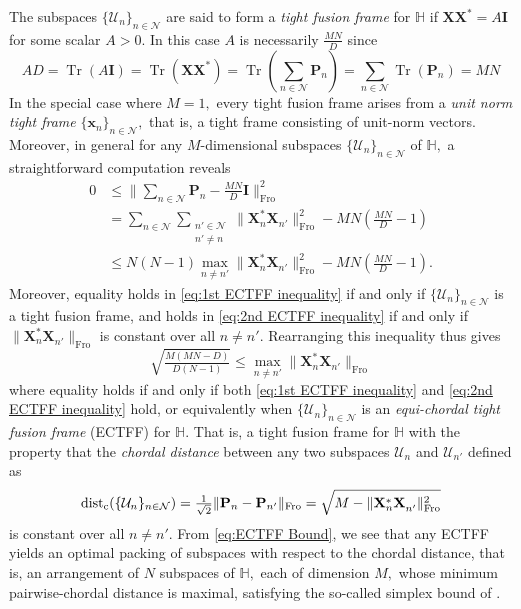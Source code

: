 \documentclass[3p,11pt]{elsarticle}
\newcommand{\bbH}{\mathbb{H}}
\newcommand{\bfI}{\mathbf{I}}
\newcommand{\bfP}{\mathbf{P}}
\newcommand{\bfx}{\mathbf{x}}
\newcommand{\bfX}{\mathbf{X}}
\newcommand{\calN}{\mathcal{N}}
\newcommand{\calU}{\mathcal{U}}
\newcommand{\rmc}{\mathrm{c}}
\newcommand{\Tr}{\operatorname{Tr}}
\newcommand{\dist}{\operatorname{dist}}
\newcommand{\Fro}{\mathrm{Fro}}
\newcommand{\norm}[1]{\|{#1}\|}
\theoremstyle{definition}
\begin{document}
The subspaces $\{\calU_n\}_{n\in\calN}$ are said to form a \textit{tight fusion frame} for $\bbH$ if $\bfX\bfX^*=A\bfI$ for some scalar $A>0.$ In this case $A$ is necessarily $\tfrac{MN}{D}$ since 
\begin{equation*}
    AD=\Tr\left(A\bfI\right)=\Tr\left(\bfX\bfX^*\right)=\Tr(\sum_{n\in\calN}\bfP_n)=\sum_{n\in\calN}\Tr\left(\bfP_n\right)=MN
\end{equation*}
In the special case where $M=1,$ every tight fusion frame arises from a \textit{unit norm tight frame} $\{\bfx_n\}_{n\in\calN},$ that is, a tight frame consisting of unit-norm vectors. Moreover, in general for any $M$-dimensional subspaces $\{\calU_n\}_{n\in\calN}$ of $\bbH,$ a straightforward computation reveals
\begin{align}
\label{eq:1st ECTFF inequality}
0&\leq\norm{\sum_{n\in\calN}\bfP_n-\tfrac{MN}{D}\bfI}_\Fro^2\\
&=\sum_{n\in\calN}\sum_{\substack{n'\in\calN\\n'\not=n}}\norm{\bfX_n^*\bfX_{n'}^{}}_\Fro^2-MN\left(\tfrac{MN}{D}-1\right)\nonumber\\
&\leq N(N-1)\max_{n\not=n'}\norm{\bfX_n^*\bfX_{n'}^{}}^2_\Fro-MN\left(\tfrac{MN}{D}-1\right).\label{eq:2nd ECTFF inequality}
\end{align}
Moreover, equality holds in \eqref{eq:1st ECTFF inequality} if and only if $\{\calU_n\}_{n\in\calN}$ is a tight fusion frame, and holds in \eqref{eq:2nd ECTFF inequality} if and only if $\norm{\bfX_n^*\bfX_{n'}^{}}_\Fro$ is constant over all $n\not=n'.$ Rearranging this inequality thus gives
\begin{equation}
\label{eq:ECTFF Bound}
    \sqrt{\tfrac{M(MN-D)}{D(N-1)}}\leq\max_{n\not=n'}\norm{\bfX_n^*\bfX_{n'}^{}}_\Fro
\end{equation} 
where equality holds if and only if both \eqref{eq:1st ECTFF inequality} and \eqref{eq:2nd ECTFF inequality} hold, or equivalently when  $\{\calU_n\}_{n\in\calN}$ is an \textit{equi-chordal tight fusion frame} (ECTFF) for $\bbH.$ That is, a tight fusion frame for $\bbH$ with the property that the \textit{chordal distance} between any two subspaces $\calU_n$ and $\calU_{n'}$ defined as \begin{equation*}
    \dist_\rmc(\{\calU_n\}_{n\in\calN})=\smash{\tfrac{1}{\sqrt{2}}\norm{\bfP_n-\bfP_{n'}}_\Fro}=\sqrt{M-\norm{\bfX_n^*\bfX_{n'}^{}}^2_\Fro}
\end{equation*}
is constant over all $n\not=n'.$ From \eqref{eq:ECTFF Bound}, we see that any ECTFF yields an optimal packing of subspaces with respect to the chordal distance, that is, an arrangement of $N$ subspaces of $\bbH,$ each of dimension $M,$ whose minimum pairwise-chordal distance is maximal, satisfying the so-called simplex bound of \cite{ConwayHS96}. 
\end{document}

